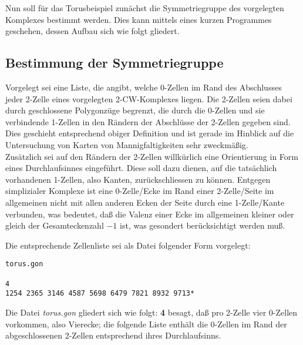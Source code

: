 Nun soll für das Torusbeispiel zunächst die Symmetriegruppe des vorgelegten
Komplexes bestimmt werden. Dies kann mittels eines kurzen Programmes geschehen,
dessen Aufbau sich wie folgt gliedert.

\subsection{Bestimmung der Symmetriegruppe}

Vorgelegt sei eine Liste, die angibt, welche 0-Zellen im Rand des Abschlusses
jeder 2-Zelle eines vorgelegten 2-CW-Komplexes liegen. Die 2-Zellen seien dabei
durch geschlossene Polygonzüge begrenzt, die durch die 0-Zellen und sie
verbindende 1-Zellen in den Rändern der Abschlüsse der 2-Zellen gegeben
sind. Dies geschieht entsprechend obiger Definition und ist gerade im Hinblick
auf die Untersuchung von Karten von Mannigfaltigkeiten sehr zweckmäßig.\\
Zusätzlich sei auf den Rändern der 2-Zellen willkürlich eine Orientierung in
Form eines Durchlaufsinnes eingeführt. Diese soll dazu dienen, auf die
tatsächlich vorhandenen 1-Zellen, also Kanten, zurückschliessen zu können.
{\scsi
Entgegen simplizialer Komplexe ist eine 0-Zelle/Ecke im Rand einer 2-Zelle/Seite
im allgemeinen nicht mit allen anderen Ecken der Seite durch eine 1-Zelle/Kante
verbunden, was bedeutet, daß die Valenz einer Ecke im allgemeinen kleiner oder
gleich der Gesamt\-eckenzahl $-1$ ist, was gesondert berücksichtigt werden
muß.
}

Die entsprechende Zellenliste sei als Datei folgender Form vorgelegt:
\begin{verbatim}
torus.gon

4
1254 2365 3146 4587 5698 6479 7821 8932 9713*
\end{verbatim}
{\scsi
Die Datei {\it torus.gon} gliedert sich wie folgt: {\bf 4} besagt, daß pro
2-Zelle vier 0-Zellen vorkommen, also Vierecke; die folgende Liste enthält die
0-Zellen im Rand der abgeschlossenen 2-Zellen entsprechend ihres Durchlaufsinns.
}

